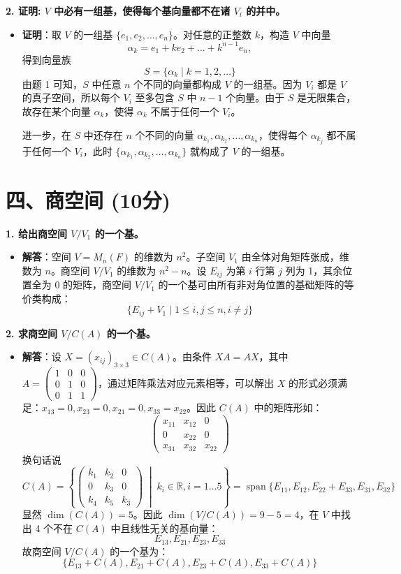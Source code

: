 \documentclass[12pt,a4paper]{article}
\DeclareMathOperator{\Span}{span}
\begin{document}
\textbf{2. 证明: $V$ 中必有一组基，使得每个基向量都不在诸 $V_i$ 的并中。}
\begin{itemize}
    \item \textbf{证明}：取 $V$ 的一组基 $\{e_1, e_2, \dots, e_n\}$。对任意的正整数 $k$，构造 $V$ 中向量
    $$ \alpha_k = e_1 + k e_2 + \dots + k^{n-1} e_n, $$
    得到向量族
    $$ S = \{\alpha_k \mid k = 1, 2, \dots\} $$
    由题 1 可知，$S$ 中任意 $n$ 个不同的向量都构成 $V$ 的一组基。因为 $V_i$ 都是 $V$ 的真子空间，所以每个 $V_i$ 至多包含 $S$ 中 $n-1$ 个向量。由于 $S$ 是无限集合，故存在某个向量 $\alpha_k$，使得 $\alpha_k$ 不属于任何一个 $V_i$。

    进一步，在 $S$ 中还存在 $n$ 个不同的向量 $\alpha_{k_1}, \alpha_{k_2}, \dots, \alpha_{k_n}$，使得每个 $\alpha_{k_j}$ 都不属于任何一个 $V_i$，此时 $\{\alpha_{k_1}, \alpha_{k_2}, \dots, \alpha_{k_n}\}$ 就构成了 $V$ 的一组基。
\end{itemize}


\section*{四、商空间 (10分)}

\textbf{1. 给出商空间 $V/V_1$ 的一个基。}
\begin{itemize}
    \item \textbf{解答}：空间 $V = M_n(F)$ 的维数为 $n^2$。子空间 $V_1$ 由全体对角矩阵张成，维数为 $n$。商空间 $V/V_1$ 的维数为 $n^2 - n$。设 $E_{ij}$ 为第 $i$ 行第 $j$ 列为 1，其余位置全为 0 的矩阵，商空间 $V/V_1$ 的一个基可由所有非对角位置的基础矩阵的等价类构成：
    $$ \{E_{ij} + V_1 \mid 1 \le i, j \le n, i \neq j\} $$
\end{itemize}

\textbf{2. 求商空间 $V/C(A)$ 的一个基。}
\begin{itemize}
    \item \textbf{解答}：设 $X = (x_{ij})_{3 \times 3} \in C(A)$。由条件 $XA = AX$，其中 $A = \begin{pmatrix} 1 & 0 & 0 \\ 0 & 1 & 0 \\ 0 & 1 & 1 \end{pmatrix}$，通过矩阵乘法对应元素相等，可以解出 $X$ 的形式必须满足：$x_{13} = 0, x_{23} = 0, x_{21} = 0, x_{33} = x_{22}$。因此 $C(A)$ 中的矩阵形如：
    $$ \begin{pmatrix} x_{11} & x_{12} & 0 \\ 0 & x_{22} & 0 \\ x_{31} & x_{32} & x_{22} \end{pmatrix} $$
    换句话说
    $$ C(A) = \left\{ \begin{pmatrix} k_1 & k_2 & 0 \\ 0 & k_3 & 0 \\ k_4 & k_5 & k_3 \end{pmatrix} \;\middle|\; k_i \in \mathbb{R}, i=1 \dots 5 \right\} = \Span\{E_{11}, E_{12}, E_{22}+E_{33}, E_{31}, E_{32}\} $$
    显然 $\dim(C(A)) = 5$。因此 $\dim(V/C(A)) = 9 - 5 = 4$，在 $V$ 中找出 4 个不在 $C(A)$ 中且线性无关的基向量：
    $$ E_{13}, E_{21}, E_{23}, E_{33} $$
    故商空间 $V/C(A)$ 的一个基为：
    $$ \{E_{13} + C(A), E_{21} + C(A), E_{23} + C(A), E_{33} + C(A)\} $$
\end{itemize}
\end{document}
